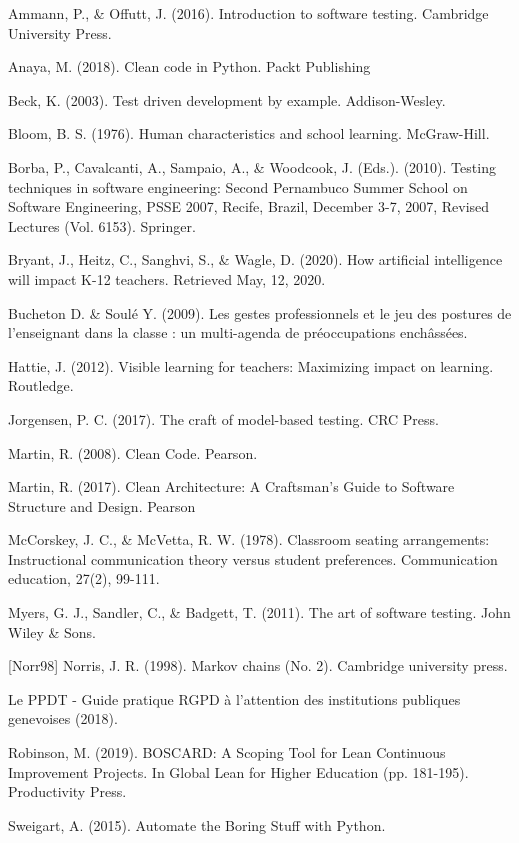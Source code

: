 \documentclass[10pt]{article}
\begin{document}
\begin{thebibliography}{Xyzz12}

 Ammann, P., \& Offutt, J. (2016). Introduction to software testing. Cambridge University Press.

 Anaya, M. (2018). Clean code in Python. Packt Publishing

 Beck, K. (2003). Test driven development by example. Addison-Wesley.

 Bloom, B. S. (1976). Human characteristics and school learning. McGraw-Hill.

 Borba, P., Cavalcanti, A., Sampaio, A., \& Woodcook, J. (Eds.). (2010). Testing techniques in software engineering: Second Pernambuco Summer School on Software Engineering, PSSE 2007, Recife, Brazil, December 3-7, 2007, Revised Lectures (Vol. 6153). Springer.

 Bryant, J., Heitz, C., Sanghvi, S., \& Wagle, D. (2020). How artificial intelligence will impact K-12 teachers. Retrieved May, 12, 2020.

 Bucheton D. \& Soulé Y. (2009). Les gestes professionnels et le jeu des postures de l’enseignant dans la classe : un multi-agenda de préoccupations enchâssées.

 Hattie, J. (2012). Visible learning for teachers: Maximizing impact on learning. Routledge.

 Jorgensen, P. C. (2017). The craft of model-based testing. CRC Press.

 Martin, R. (2008). Clean Code. Pearson.

 Martin, R. (2017). Clean Architecture: A Craftsman’s Guide to Software Structure and Design. Pearson

 McCorskey, J. C., \& McVetta, R. W. (1978). Classroom seating arrangements: Instructional communication theory versus student preferences. Communication education, 27(2), 99-111.

 Myers, G. J., Sandler, C., \& Badgett, T. (2011). The art of software testing. John Wiley \& Sons.

[Norr98] Norris, J. R. (1998). Markov chains (No. 2). Cambridge university press.

 Le PPDT - Guide pratique RGPD à l'attention des institutions publiques genevoises (2018).


 Robinson, M. (2019). BOSCARD: A Scoping Tool for Lean Continuous Improvement Projects. In Global Lean for Higher Education (pp. 181-195). Productivity Press.

 Sweigart, A. (2015). Automate the Boring Stuff with Python.
\end{thebibliography}
\end{document}
